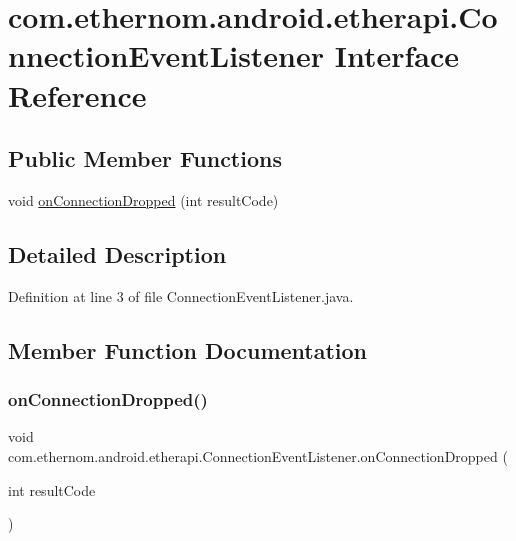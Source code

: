 \hypertarget{interfacecom_1_1ethernom_1_1android_1_1etherapi_1_1_connection_event_listener}{}\section{com.\+ethernom.\+android.\+etherapi.\+Connection\+Event\+Listener Interface Reference}
\label{interfacecom_1_1ethernom_1_1android_1_1etherapi_1_1_connection_event_listener}
\subsection*{Public Member Functions}
\begin{DoxyCompactItemize}
\item 
void \mbox{\hyperlink{interfacecom_1_1ethernom_1_1android_1_1etherapi_1_1_connection_event_listener_acc0b5837e4cf7a81b6a3fb958be88067}{on\+Connection\+Dropped}} (int result\+Code)
\end{DoxyCompactItemize}


\subsection{Detailed Description}


Definition at line 3 of file Connection\+Event\+Listener.\+java.



\subsection{Member Function Documentation}
\mbox{\label{interfacecom_1_1ethernom_1_1android_1_1etherapi_1_1_connection_event_listener_acc0b5837e4cf7a81b6a3fb958be88067}} 
\subsubsection{\texorpdfstring{on\+Connection\+Dropped()}{onConnectionDropped()}}
{\footnotesize\ttfamily void com.\+ethernom.\+android.\+etherapi.\+Connection\+Event\+Listener.\+on\+Connection\+Dropped (\begin{DoxyParamCaption}\item[{int}]{result\+Code }\end{DoxyParamCaption})}

